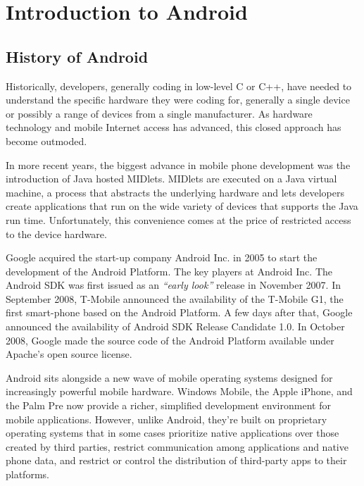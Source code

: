 
\section{Introduction to Android}
\subsection{History of Android}
Historically, developers, generally coding in low-level C or C++, have needed to understand the specific hardware they were coding for, generally a single device or possibly a range of devices from a single manufacturer. As hardware technology and mobile Internet access has advanced, this closed approach has become outmoded.

In more recent years, the biggest advance in mobile phone development was the introduction of Java hosted MIDlets. MIDlets are executed on a Java virtual machine, a process that abstracts the underlying hardware and lets developers create applications that run on the wide variety of devices that supports the Java run time. Unfortunately, this convenience comes at the price of restricted access to the device hardware.

Google acquired the start-up company Android Inc. in 2005 to start the development of the Android Platform. The key players at Android Inc. The Android SDK was first issued as an \emph{“early look”} release in November 2007. In September 2008, T-Mobile announced the availability of the T-Mobile G1, the first smart-phone based on the Android Platform. A few days after that, Google announced the availability of Android SDK Release Candidate 1.0. In October 2008, Google made the source code of the Android Platform available under Apache's open source license.

Android sits alongside a new wave of mobile operating systems designed for increasingly powerful mobile hardware. Windows Mobile, the Apple iPhone, and the Palm Pre now provide a richer, simplified development environment for mobile applications. However, unlike Android, they're built on proprietary operating systems that in some cases prioritize native applications over those created by third parties, restrict communication among applications and native phone data, and restrict or control the distribution of third-party apps to their platforms.

